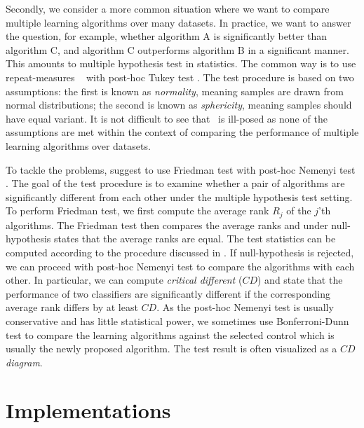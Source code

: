 {Secondly, we consider a more common situation where we want to compare multiple learning algorithms over many datasets.
In practice, we want to answer the question, for example, whether algorithm A is significantly better than algorithm C, and algorithm C outperforms algorithm B in a significant manner.
This amounts to multiple hypothesis test in statistics.
The common way is to use repeat-measures \anova\ \citep{Fisher59statistical} with post-hoc Tukey test \citep{Turkey49comparing}. 
The test procedure is based on two assumptions: the first is known as \textit{normality}, meaning samples are drawn from normal distributions; the second is known as \textit{sphericity}, meaning samples should have equal variant.
It is not difficult to see that \anova\ is ill-posed as none of the assumptions are met within the context of comparing the performance of multiple learning algorithms over datasets.

To tackle the problems, \citet{Demsar06statistical} suggest to use Friedman test \citep{Friedman37the,Friedman40Comparison} with post-hoc Nemenyi test \citep{Nemenyi63distribution}.
The goal of the test procedure is to examine whether a pair of algorithms are significantly different from each other under the multiple hypothesis test setting.
To perform Friedman test, we first compute the average rank $R_j$ of the $j$'th algorithms.
The Friedman test then compares the average ranks and under null-hypothesis states that the average ranks are equal.
The test statistics can be computed according to the procedure discussed in \citep{Demsar06statistical}.
If null-hypothesis is rejected, we can proceed with post-hoc Nemenyi test to compare the algorithms with each other.
In particular, we can compute \textit{critical different} ($CD$) and state that the performance of two classifiers are significantly different if the corresponding average rank differs by at least $CD$.
As the post-hoc Nemenyi test is usually conservative and has little statistical power, we sometimes use Bonferroni-Dunn test \citep{Dunn61mulitple} to compare the learning algorithms against the selected control which is usually the newly proposed algorithm.
The test result is often visualized as a \textit{$CD$ diagram}.
\fi








%
%
\chapter{Implementations} \label{ch_implementation}

}
